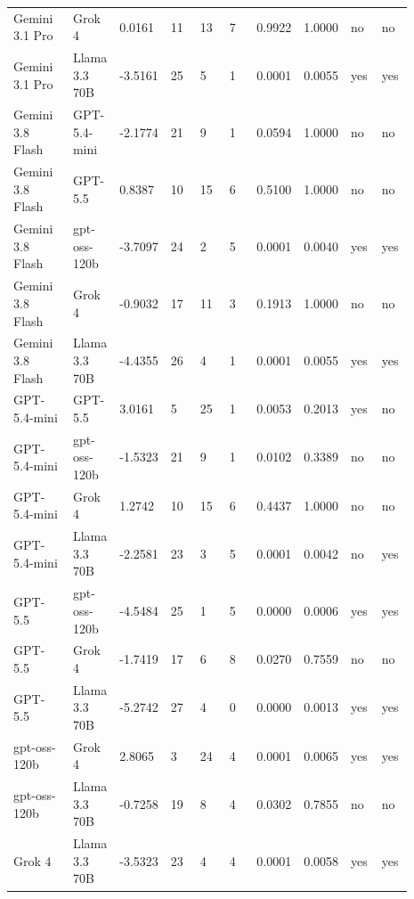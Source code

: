 \begin{landscape}
\begin{longtable}{p{0.162\linewidth}p{0.081\linewidth}p{0.081\linewidth}p{0.081\linewidth}p{0.081\linewidth}p{0.081\linewidth}p{0.081\linewidth}p{0.081\linewidth}p{0.081\linewidth}p{0.081\linewidth}}
Gemini 3.1 Pro & Grok 4 & 0.0161 & 11 & 13 & 7 & 0.9922 & 1.0000 & no & no \\
Gemini 3.1 Pro & Llama 3.3 70B & -3.5161 & 25 & 5 & 1 & 0.0001 & 0.0055 & yes & yes \\
Gemini 3.8 Flash & GPT-5.4-mini & -2.1774 & 21 & 9 & 1 & 0.0594 & 1.0000 & no & no \\
Gemini 3.8 Flash & GPT-5.5 & 0.8387 & 10 & 15 & 6 & 0.5100 & 1.0000 & no & no \\
Gemini 3.8 Flash & gpt-oss-120b & -3.7097 & 24 & 2 & 5 & 0.0001 & 0.0040 & yes & yes \\
Gemini 3.8 Flash & Grok 4 & -0.9032 & 17 & 11 & 3 & 0.1913 & 1.0000 & no & no \\
Gemini 3.8 Flash & Llama 3.3 70B & -4.4355 & 26 & 4 & 1 & 0.0001 & 0.0055 & yes & yes \\
GPT-5.4-mini & GPT-5.5 & 3.0161 & 5 & 25 & 1 & 0.0053 & 0.2013 & yes & no \\
GPT-5.4-mini & gpt-oss-120b & -1.5323 & 21 & 9 & 1 & 0.0102 & 0.3389 & no & no \\
GPT-5.4-mini & Grok 4 & 1.2742 & 10 & 15 & 6 & 0.4437 & 1.0000 & no & no \\
GPT-5.4-mini & Llama 3.3 70B & -2.2581 & 23 & 3 & 5 & 0.0001 & 0.0042 & no & yes \\
GPT-5.5 & gpt-oss-120b & -4.5484 & 25 & 1 & 5 & 0.0000 & 0.0006 & yes & yes \\
GPT-5.5 & Grok 4 & -1.7419 & 17 & 6 & 8 & 0.0270 & 0.7559 & no & no \\
GPT-5.5 & Llama 3.3 70B & -5.2742 & 27 & 4 & 0 & 0.0000 & 0.0013 & yes & yes \\
gpt-oss-120b & Grok 4 & 2.8065 & 3 & 24 & 4 & 0.0001 & 0.0065 & yes & yes \\
gpt-oss-120b & Llama 3.3 70B & -0.7258 & 19 & 8 & 4 & 0.0302 & 0.7855 & no & no \\
Grok 4 & Llama 3.3 70B & -3.5323 & 23 & 4 & 4 & 0.0001 & 0.0058 & yes & yes \\
\bottomrule
\end{longtable}
\normalsize
\end{landscape}
